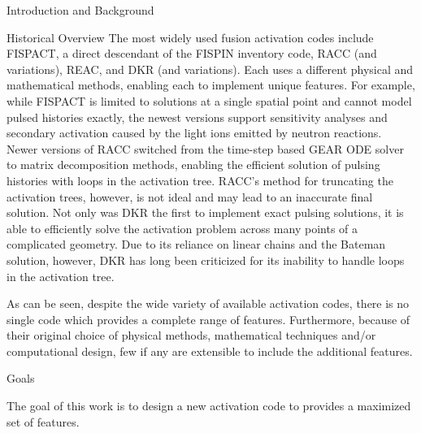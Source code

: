 \begin{chapter}{Introduction and Background}
\begin{section}{Historical Overview}
  The most widely used fusion activation codes include
  FISPACT\cite{FISPACT}, a direct descendant of the FISPIN inventory
  code, RACC\cite{RACC} (and variations\cite{RACCP,RACCUW}),
  REAC\cite{REAC}, and DKR\cite{DKR} (and
  variations\cite{adjoint,DKRICF,DKRP}).  Each uses a different
  physical and mathematical methods, enabling each to implement unique
  features.  For example, while FISPACT is limited to solutions at a
  single spatial point and cannot model pulsed histories exactly, the
  newest versions support sensitivity analyses and secondary
  activation caused by the light ions emitted by neutron reactions.
  Newer versions of RACC switched from the time-step based GEAR ODE
  solver to matrix decomposition methods, enabling the efficient
  solution of pulsing histories with loops in the activation tree.
  RACC's method for truncating the activation trees, however, is not
  ideal and may lead to an inaccurate final solution.  Not only was
  DKR the first to implement exact pulsing solutions, it is able to
  efficiently solve the activation problem across many points of a
  complicated geometry.  Due to its reliance on linear chains and the
  Bateman solution, however, DKR has long been criticized for its
  inability to handle loops in the activation tree.
  
  As can be seen, despite the wide variety of available activation
  codes, there is no single code which provides a complete range of
  features.  Furthermore, because of their original choice of physical
  methods, mathematical techniques and/or computational design, few if
  any are extensible to include the additional features.
  

\end{section}

\begin{section}{Goals}
  
  The goal of this work is to design a new activation code to provides
  a maximized set of features. 

\end{section}


\end{chapter}